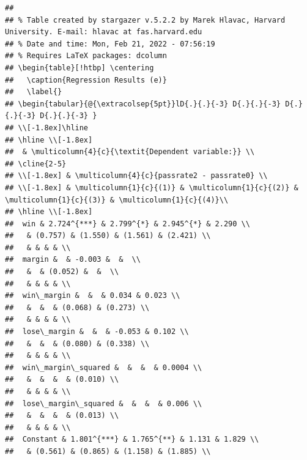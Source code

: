 \documentclass[
  12pt,
  landscape]{article}
\begin{document}
\begin{verbatim}
## 
## % Table created by stargazer v.5.2.2 by Marek Hlavac, Harvard University. E-mail: hlavac at fas.harvard.edu
## % Date and time: Mon, Feb 21, 2022 - 07:56:19
## % Requires LaTeX packages: dcolumn 
## \begin{table}[!htbp] \centering 
##   \caption{Regression Results (e)} 
##   \label{} 
## \begin{tabular}{@{\extracolsep{5pt}}lD{.}{.}{-3} D{.}{.}{-3} D{.}{.}{-3} D{.}{.}{-3} } 
## \\[-1.8ex]\hline 
## \hline \\[-1.8ex] 
##  & \multicolumn{4}{c}{\textit{Dependent variable:}} \\ 
## \cline{2-5} 
## \\[-1.8ex] & \multicolumn{4}{c}{passrate2 - passrate0} \\ 
## \\[-1.8ex] & \multicolumn{1}{c}{(1)} & \multicolumn{1}{c}{(2)} & \multicolumn{1}{c}{(3)} & \multicolumn{1}{c}{(4)}\\ 
## \hline \\[-1.8ex] 
##  win & 2.724^{***} & 2.799^{*} & 2.945^{*} & 2.290 \\ 
##   & (0.757) & (1.550) & (1.561) & (2.421) \\ 
##   & & & & \\ 
##  margin &  & -0.003 &  &  \\ 
##   &  & (0.052) &  &  \\ 
##   & & & & \\ 
##  win\_margin &  &  & 0.034 & 0.023 \\ 
##   &  &  & (0.068) & (0.273) \\ 
##   & & & & \\ 
##  lose\_margin &  &  & -0.053 & 0.102 \\ 
##   &  &  & (0.080) & (0.338) \\ 
##   & & & & \\ 
##  win\_margin\_squared &  &  &  & 0.0004 \\ 
##   &  &  &  & (0.010) \\ 
##   & & & & \\ 
##  lose\_margin\_squared &  &  &  & 0.006 \\ 
##   &  &  &  & (0.013) \\ 
##   & & & & \\ 
##  Constant & 1.801^{***} & 1.765^{**} & 1.131 & 1.829 \\ 
##   & (0.561) & (0.865) & (1.158) & (1.885) \\ 

\end{verbatim}
\end{document}
